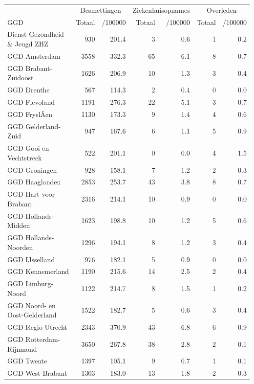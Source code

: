 \documentclass[
  english,
  man,floatsintext]{apa6}
\begin{document}
\begin{table}
\centering\begingroup\fontsize{10}{12}\selectfont

\begin{threeparttable}
\begin{tabular}{lrrrrrr}
\toprule
\multicolumn{1}{c}{ } & \multicolumn{2}{c}{Besmettingen} & \multicolumn{2}{c}{Ziekenhuisopnames} & \multicolumn{2}{c}{Overleden} \\
\cmidrule(l{3pt}r{3pt}){2-3} \cmidrule(l{3pt}r{3pt}){4-5} \cmidrule(l{3pt}r{3pt}){6-7}
GGD & Totaal & /100000 & Totaal & /100000 & Totaal & /100000\\
\midrule
Dienst Gezondheid \& Jeugd ZHZ & 930 & 201.4 & 3 & 0.6 & 1 & 0.2\\
GGD Amsterdam & 3558 & 332.3 & 65 & 6.1 & 8 & 0.7\\
GGD Brabant-Zuidoost & 1626 & 206.9 & 10 & 1.3 & 3 & 0.4\\
GGD Drenthe & 567 & 114.3 & 2 & 0.4 & 0 & 0.0\\
GGD Flevoland & 1191 & 276.3 & 22 & 5.1 & 3 & 0.7\\
GGD FryslÃ¢n & 1130 & 173.3 & 9 & 1.4 & 4 & 0.6\\
GGD Gelderland-Zuid & 947 & 167.6 & 6 & 1.1 & 5 & 0.9\\
GGD Gooi en Vechtstreek & 522 & 201.1 & 0 & 0.0 & 4 & 1.5\\
GGD Groningen & 928 & 158.1 & 7 & 1.2 & 2 & 0.3\\
GGD Haaglanden & 2853 & 253.7 & 43 & 3.8 & 8 & 0.7\\
GGD Hart voor Brabant & 2316 & 214.1 & 10 & 0.9 & 0 & 0.0\\
GGD Hollands-Midden & 1623 & 198.8 & 10 & 1.2 & 5 & 0.6\\
GGD Hollands-Noorden & 1296 & 194.1 & 8 & 1.2 & 3 & 0.4\\
GGD IJsselland & 976 & 182.1 & 5 & 0.9 & 0 & 0.0\\
GGD Kennemerland & 1190 & 215.6 & 14 & 2.5 & 2 & 0.4\\
GGD Limburg-Noord & 1122 & 214.7 & 8 & 1.5 & 1 & 0.2\\
GGD Noord- en Oost-Gelderland & 1522 & 182.7 & 5 & 0.6 & 3 & 0.4\\
GGD Regio Utrecht & 2343 & 370.9 & 43 & 6.8 & 6 & 0.9\\
GGD Rotterdam-Rijnmond & 3650 & 267.8 & 38 & 2.8 & 2 & 0.1\\
GGD Twente & 1397 & 105.1 & 9 & 0.7 & 1 & 0.1\\
GGD West-Brabant & 1303 & 183.0 & 13 & 1.8 & 2 & 0.3\\

\end{tabular}
\end{threeparttable}
\end{table}
\end{document}
